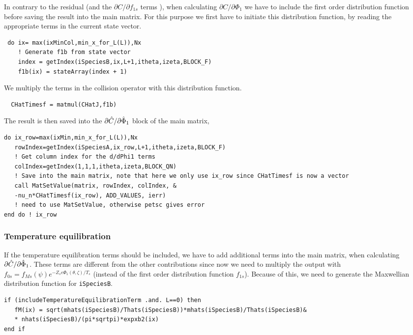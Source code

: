 \documentclass[12pt]{article}
\begin{document}
In contrary to the residual (and the $\partial C/\partial f_{1s}$ terms ), when calculating $\partial C/\partial \Phi_1$ we have to include the first order distribution function before saving the result into the main matrix. For this purpose we first have to initiate this distribution function, by reading the appropriate terms in the current state vector. 

\begin{lstlisting}
 do ix= max(ixMinCol,min_x_for_L(L)),Nx
    ! Generate f1b from state vector
    index = getIndex(iSpeciesB,ix,L+1,itheta,izeta,BLOCK_F) 
    f1b(ix) = stateArray(index + 1)
\end{lstlisting}

\noindent
We multiply the terms in the collision operator with this distribution function.

 \begin{lstlisting}
  CHatTimesf = matmul(CHatJ,f1b)
 \end{lstlisting}
\noindent
The result is then saved into the $\partial \Hat C/\partial \hat \Phi_1$ block of the main matrix,

 \begin{lstlisting}
do ix_row=max(ixMin,min_x_for_L(L)),Nx
   rowIndex=getIndex(iSpeciesA,ix_row,L+1,itheta,izeta,BLOCK_F)
   ! Get column index for the d/dPhi1 terms
   colIndex=getIndex(1,1,1,itheta,izeta,BLOCK_QN)
   ! Save into the main matrix, note that here we only use ix_row since CHatTimesf is now a vector
   call MatSetValue(matrix, rowIndex, colIndex, & 
   -nu_n*CHatTimesf(ix_row), ADD_VALUES, ierr) 
   ! need to use MatSetValue, otherwise petsc gives error
end do ! ix_row
\end{lstlisting}
\noindent

\subsubsection*{Temperature equilibration}
\label{sec:Jac2}
If the temperature equilibration terms should be included, we have to add additional terms into the main matrix, when calculating  $\partial \Hat C/\partial \hat \Phi_1$. These terms are different from the other contributions since now we need to multiply the output with $f_{0s} = f_{Ms}(\psi)e^{-Z_se\Phi_1(\theta,\zeta)/T_s}$ (instead of the first order distribution function $f_{1s}$). Because of this, we need to generate the Maxwellian distribution function for \texttt{iSpeciesB}.

\begin{lstlisting}
if (includeTemperatureEquilibrationTerm .and. L==0) then
   fM(ix) = sqrt(mhats(iSpeciesB)/Thats(iSpeciesB))*mhats(iSpeciesB)/Thats(iSpeciesB)&
   * nhats(iSpeciesB)/(pi*sqrtpi)*expxb2(ix)
end if   
\end{lstlisting}
\end{document}
